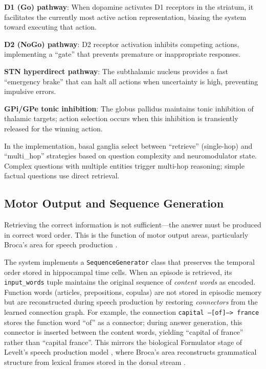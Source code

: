 \documentclass[11pt]{article}
\begin{document}
\textbf{D1 (Go) pathway}: When dopamine activates D1 receptors in the striatum, it facilitates the currently most active action representation, biasing the system toward executing that action.

\textbf{D2 (NoGo) pathway}: D2 receptor activation inhibits competing actions, implementing a ``gate'' that prevents premature or inappropriate responses.

\textbf{STN hyperdirect pathway}: The subthalamic nucleus provides a fast ``emergency brake'' that can halt all actions when uncertainty is high, preventing impulsive errors.

\textbf{GPi/GPe tonic inhibition}: The globus pallidus maintains tonic inhibition of thalamic targets; action selection occurs when this inhibition is transiently released for the winning action.

In the implementation, basal ganglia select between ``retrieve'' (single-hop) and ``multi\_hop'' strategies based on question complexity and neuromodulator state. Complex questions with multiple entities trigger multi-hop reasoning; simple factual questions use direct retrieval.

\subsection{Motor Output and Sequence Generation}

Retrieving the correct information is not sufficient---the answer must be produced in correct word order. This is the function of motor output areas, particularly Broca's area for speech production \citep{hickok2007cortical}.

The system implements a \texttt{SequenceGenerator} class that preserves the temporal order stored in hippocampal time cells. When an episode is retrieved, its \texttt{input\_words} tuple maintains the original sequence of \emph{content words} as encoded. Function words (articles, prepositions, copulas) are not stored in episodic memory but are reconstructed during speech production by restoring \emph{connectors} from the learned connection graph. For example, the connection \texttt{capital --[of]--> france} stores the function word ``of'' as a connector; during answer generation, this connector is inserted between the content words, yielding ``capital of france'' rather than ``capital france''. This mirrors the biological Formulator stage of Levelt's speech production model \citep{levelt1989speaking}, where Broca's area reconstructs grammatical structure from lexical frames stored in the dorsal stream \citep{hagoort2005broca,hickok2007cortical}.
\end{document}
